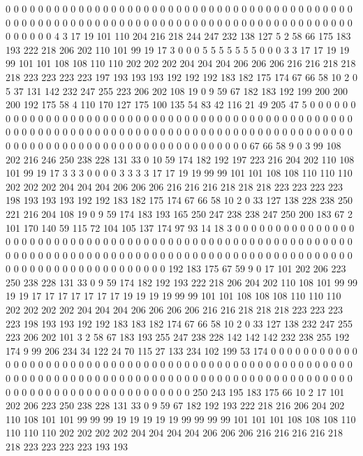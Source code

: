 0 0 0 0 0 0 0 0 0 0 0 0 0 0 0 0 0 0 0 0
0 0 0 0 0 0 0 0 0 0 0 0 0 0 0 0 0 0 0 0
0 0 0 0 0 0 0 0 0 0 0 0 0 0 0 0 0 0 0 0
0 0 0 0 0 0 0 0 0 0 0 0 0 0 0 0 0 0 0 0
0 0 0 0 0 0 0 0 0 0 0 0 4 3 17 19 101 110 204 216
218 244 247 232 138 127 5 2 58 66 175 183 193 222 218 206 202 110 101 99
19 17 3 0 0 0 5 5 5 5 5 5 5 0 0 0 3 3 17 17
19 19 99 101 101 108 108 110 110 202 202 202 204 204 204 206 206 206 216 216
218 218 218 223 223 223 223 197 193 193 193 192 192 192 183 182 175 174 67 66
58 10 2 0 5 37 131 142 232 247 255 223 206 202 108 19 0 9 59 67
182 183 192 199 200 200 200 192 175 58 4 110 170 127 175 100 135 54 83 42
116 21 49 205 47 5 0 0 0 0 0 0 0 0 0 0 0 0 0 0
0 0 0 0 0 0 0 0 0 0 0 0 0 0 0 0 0 0 0 0
0 0 0 0 0 0 0 0 0 0 0 0 0 0 0 0 0 0 0 0
0 0 0 0 0 0 0 0 0 0 0 0 0 0 0 0 0 0 0 0
0 0 0 0 0 0 0 0 0 0 0 0 0 0 0 0 0 0 0 0
0 0 0 0 0 0 0 0 0 0 0 0 0 0 0 0 0 0 0 0
0 0 0 0 0 0 0 0 67 66 58 9 0 3 99 108 202 216 246 250
238 228 131 33 0 10 59 174 182 192 197 223 216 204 202 110 108 101 99 19
17 3 3 3 0 0 0 0 3 3 3 3 17 17 19 19 99 99 101 101
108 108 110 110 110 202 202 202 204 204 204 206 206 206 216 216 216 218 218 218
223 223 223 223 198 193 193 193 192 192 183 182 175 174 67 66 58 10 2 0
33 127 138 228 238 250 221 216 204 108 19 0 9 59 174 183 193 165 250 247
238 238 247 250 200 183 67 2 101 170 140 59 115 72 104 105 137 174 97 93
14 18 3 0 0 0 0 0 0 0 0 0 0 0 0 0 0 0 0 0
0 0 0 0 0 0 0 0 0 0 0 0 0 0 0 0 0 0 0 0
0 0 0 0 0 0 0 0 0 0 0 0 0 0 0 0 0 0 0 0
0 0 0 0 0 0 0 0 0 0 0 0 0 0 0 0 0 0 0 0
0 0 0 0 0 0 0 0 0 0 0 0 0 0 0 0 0 0 0 0
0 0 0 0 0 0 0 0 0 0 0 0 0 0 0 0 0 0 0 0
0 0 0 0 192 183 175 67 59 9 0 17 101 202 206 223 250 238 228 131
33 0 9 59 174 182 192 193 222 218 206 204 202 110 108 101 99 99 19 19
17 17 17 17 17 17 17 19 19 19 19 99 99 101 101 108 108 108 110 110
110 202 202 202 202 204 204 204 206 206 206 206 216 216 218 218 218 223 223 223
223 198 193 193 192 192 183 183 182 174 67 66 58 10 2 0 33 127 138 232
247 255 223 206 202 101 3 2 58 67 183 193 255 247 238 228 142 142 142 232
238 255 192 174 9 99 206 234 34 122 24 70 115 27 133 234 102 199 53 174
0 0 0 0 0 0 0 0 0 0 0 0 0 0 0 0 0 0 0 0
0 0 0 0 0 0 0 0 0 0 0 0 0 0 0 0 0 0 0 0
0 0 0 0 0 0 0 0 0 0 0 0 0 0 0 0 0 0 0 0
0 0 0 0 0 0 0 0 0 0 0 0 0 0 0 0 0 0 0 0
0 0 0 0 0 0 0 0 0 0 0 0 0 0 0 0 0 0 0 0
0 0 0 0 0 0 0 0 0 0 0 0 0 0 0 0 0 0 0 0
250 243 195 183 175 66 10 2 17 101 202 206 223 250 238 228 131 33 0 9
59 67 182 192 193 222 218 216 206 204 202 110 108 101 101 99 99 99 19 19
19 19 19 99 99 99 99 101 101 101 108 108 108 110 110 110 110 202 202 202
202 204 204 204 204 206 206 206 216 216 216 216 218 218 223 223 223 223 193 193
